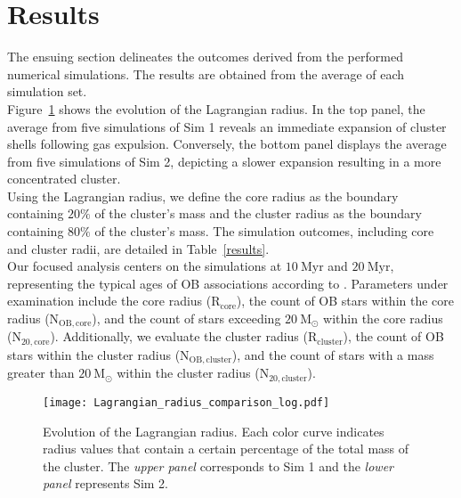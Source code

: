 \documentclass[baaa]{baaa}
\begin{document}
\section{Results} \label{Results}
The ensuing section delineates the outcomes derived from the performed numerical simulations. The results are obtained from the average of each simulation set.\\
Figure~\ref{Lagrangian_radius_comparison} shows the evolution of the Lagrangian radius. In the top panel, the average from five simulations of Sim 1 reveals an immediate expansion of cluster shells following gas expulsion. Conversely, the bottom panel displays the average from five simulations of Sim 2, depicting a slower expansion resulting in a more concentrated cluster.\\
Using the Lagrangian radius, we define the core radius as the boundary containing $20 \%$ of the cluster's mass and the cluster radius as the boundary containing $80 \%$ of the cluster's mass. The simulation outcomes, including core and cluster radii, are detailed in Table~\ref{results}.\\
Our focused analysis centers on the simulations at $10~\mathrm{Myr}$ and $20~\mathrm{Myr}$, representing the typical ages of OB associations according to \cite{N_Wright_2020}. Parameters under examination include the core radius (R$_{\mathrm{core}}$), the count of OB stars within the core radius (N$_\mathrm{OB,core}$), and the count of stars exceeding $20~\mathrm{M_\odot}$ within the core radius (N$_\mathrm{20,core}$). Additionally, we evaluate the cluster radius (R$_{\mathrm{cluster}}$), the count of OB stars within the cluster radius (N$_\mathrm{OB,cluster}$), and the count of stars with a mass greater than $20~\mathrm{M_\odot}$ within the cluster radius (N$_\mathrm{20,cluster}$).

\begin{figure}[!t]
\centering
\texttt{[image: Lagrangian\_radius\_comparison\_log.pdf]}
\caption{Evolution of the Lagrangian radius. Each color curve indicates radius values that contain a certain percentage of the total mass of the cluster. The {\emph{upper panel}} corresponds to Sim 1 and the {\emph{lower panel}} represents Sim 2.}
\label{Lagrangian_radius_comparison}
\end{figure}
\end{document}

